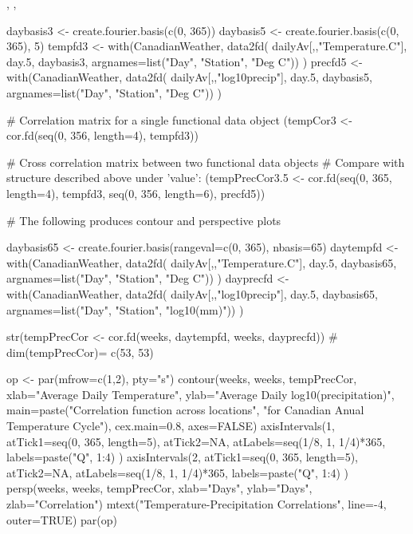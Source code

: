 \documentclass{article}
\begin{document}
\begin{SeeAlso}\relax
{}, 
, 
\end{SeeAlso}
\begin{Examples}
\begin{ExampleCode}
daybasis3 <- create.fourier.basis(c(0, 365))
daybasis5 <- create.fourier.basis(c(0, 365), 5)
tempfd3 <- with(CanadianWeather, data2fd(
       dailyAv[,,"Temperature.C"], day.5,
       daybasis3, argnames=list("Day", "Station", "Deg C")) )
precfd5 <- with(CanadianWeather, data2fd(
       dailyAv[,,"log10precip"], day.5,
       daybasis5, argnames=list("Day", "Station", "Deg C")) )

# Correlation matrix for a single functional data object
(tempCor3 <- cor.fd(seq(0, 356, length=4), tempfd3))

# Cross correlation matrix between two functional data objects 
# Compare with structure described above under 'value':
(tempPrecCor3.5 <- cor.fd(seq(0, 365, length=4), tempfd3,
                          seq(0, 356, length=6), precfd5))

# The following produces contour and perspective plots

daybasis65 <- create.fourier.basis(rangeval=c(0, 365), nbasis=65)
daytempfd <- with(CanadianWeather, data2fd(
       dailyAv[,,"Temperature.C"], day.5,
       daybasis65, argnames=list("Day", "Station", "Deg C")) )
dayprecfd <- with(CanadianWeather, data2fd(
       dailyAv[,,"log10precip"], day.5,
       daybasis65, argnames=list("Day", "Station", "log10(mm)")) )

str(tempPrecCor <- cor.fd(weeks, daytempfd, weeks, dayprecfd))
# dim(tempPrecCor)= c(53, 53)

op <- par(mfrow=c(1,2), pty="s")
contour(weeks, weeks, tempPrecCor, 
        xlab="Average Daily Temperature",
        ylab="Average Daily log10(precipitation)",
        main=paste("Correlation function across locations\n",
          "for Canadian Anual Temperature Cycle"),
        cex.main=0.8, axes=FALSE)
axisIntervals(1, atTick1=seq(0, 365, length=5), atTick2=NA, 
            atLabels=seq(1/8, 1, 1/4)*365,
            labels=paste("Q", 1:4) )
axisIntervals(2, atTick1=seq(0, 365, length=5), atTick2=NA, 
            atLabels=seq(1/8, 1, 1/4)*365,
            labels=paste("Q", 1:4) )
persp(weeks, weeks, tempPrecCor,
      xlab="Days", ylab="Days", zlab="Correlation")
mtext("Temperature-Precipitation Correlations", line=-4, outer=TRUE)
par(op)


\end{ExampleCode}
\end{Examples}
\end{document}
